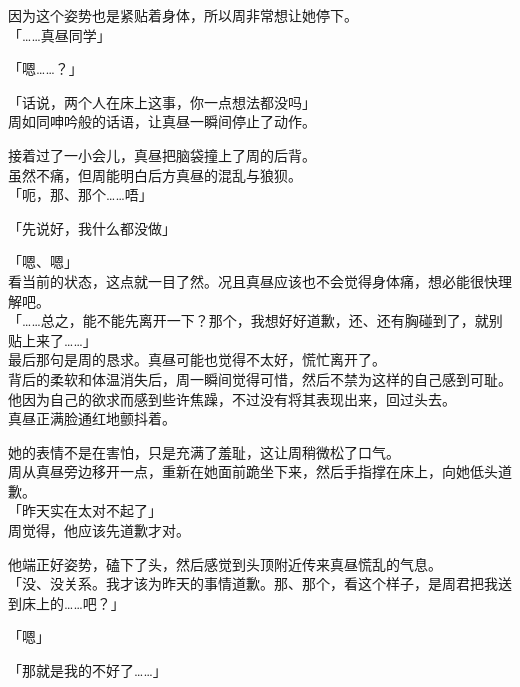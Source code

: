 因为这个姿势也是紧贴着身体，所以周非常想让她停下。\\

「……真昼同学」

「嗯……？」

「话说，两个人在床上这事，你一点想法都没吗」\\

周如同呻吟般的话语，让真昼一瞬间停止了动作。

接着过了一小会儿，真昼把脑袋撞上了周的后背。\\

虽然不痛，但周能明白后方真昼的混乱与狼狈。\\

「呃，那、那个……唔」

「先说好，我什么都没做」

「嗯、嗯」\\

看当前的状态，这点就一目了然。况且真昼应该也不会觉得身体痛，想必能很快理解吧。\\

「……总之，能不能先离开一下？那个，我想好好道歉，还、还有胸碰到了，就别贴上来了……」\\

最后那句是周的恳求。真昼可能也觉得不太好，慌忙离开了。\\

背后的柔软和体温消失后，周一瞬间觉得可惜，然后不禁为这样的自己感到可耻。\\

他因为自己的欲求而感到些许焦躁，不过没有将其表现出来，回过头去。\\

真昼正满脸通红地颤抖着。

她的表情不是在害怕，只是充满了羞耻，这让周稍微松了口气。\\

周从真昼旁边移开一点，重新在她面前跪坐下来，然后手指撑在床上，向她低头道歉。\\

「昨天实在太对不起了」\\

周觉得，他应该先道歉才对。

他端正好姿势，磕下了头，然后感觉到头顶附近传来真昼慌乱的气息。\\

「没、没关系。我才该为昨天的事情道歉。那、那个，看这个样子，是周君把我送到床上的……吧？」

「嗯」

「那就是我的不好了……」

